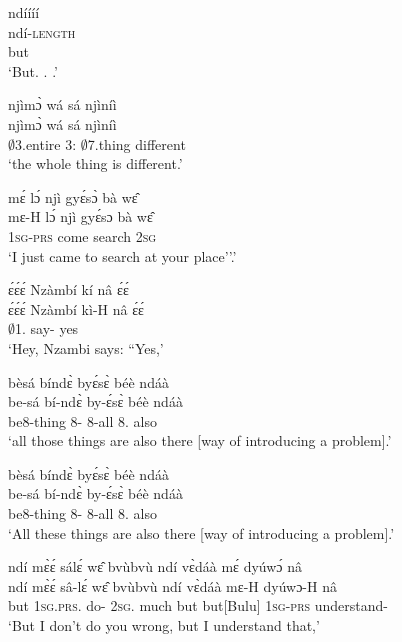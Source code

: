 \begin{exe}[(N234)]
\exN\label{n118}
  \glll ndíííí \\
        ndí-\textsc{length} \\
        but \\
    \trans `But. . .'
 
\exN\label{n119}
  \glll njìmɔ̀ wá sá njìníì \\
        njìmɔ̀ wá sá njìníì \\
        $\emptyset$3.entire 3:{\ATT}  $\emptyset$7.thing different \\
    \trans `the whole thing is different.'
 
\exN\label{n120}
  \glll mɛ́ lɔ́ njì gyɛ́sɔ̀ bà wɛ̂ \\
       mɛ-H lɔ́ njì gyɛ́sɔ bà wɛ̂ \\
       1\textsc{sg}-\textsc{prs} {\RETRO}  come search {\AP} 2\textsc{sg}  \\
    \trans `I just came to search at your place''.'
 
\exN\label{n121}
  \glll ɛ́ɛ́ɛ́ Nzàmbí kí nâ ɛ́ɛ́ \\
       ɛ́ɛ́ɛ́ Nzàmbí kì-H nâ ɛ́ɛ́ \\
       {\EXCL} $\emptyset$1.{\PN} say-{\R} {\COMP} yes  \\
    \trans `Hey, Nzambi says: ``Yes,'
 
\exN\label{n122} 
  \glll bèsá bíndɛ̀ byɛ́sɛ̀ béè ndáà \\
       be-sá bí-ndɛ̀ by-ɛ́sɛ̀ béè ndáà \\
        be8-thing 8-{\ANA} 8-all 8.{\COP} also \\
    \trans `all those things are also there [way of introducing a problem].'
 
\exN\label{n123}
  \glll bèsá bíndɛ̀ byɛ́sɛ̀ béè ndáà \\
        be-sá bí-ndɛ̀ by-ɛ́sɛ̀ béè ndáà \\
        be8-thing 8-{\ANA} 8-all 8.{\COP} also \\
    \trans `All these things are also there [way of introducing a problem].'
 
\exN\label{n124}
  \glll ndí mɛ̀ɛ́ sálɛ́ wɛ̂ bvùbvù ndí vɛ̀dáà mɛ́ dyúwɔ́ nâ \\
        ndí mɛ̀ɛ́ sâ-lɛ́ wɛ̂ bvùbvù ndí vɛ̀dáà mɛ-H dyúwɔ-H nâ \\
       but 1\textsc{sg}.\textsc{prs}.{\NEG} do-{\NEG} 2\textsc{sg}.{\OBJ} much but but[Bulu] 1\textsc{sg}-\textsc{prs} understand-{\R} {\COMP}   \\
    \trans `But I don't do you wrong, but I understand that,'
 

\end{exe}
